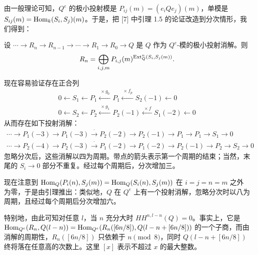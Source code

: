 由一般理论可知，$Q^e$ 的极小投射模是 $P_{ij}(m)=(e_iQe_j)(m)$，单模是 $S_{ij}(m)=\operatorname{Hom}_k(S_i,S_j)(m)$。于是，把 [7] 中引理 1.5 的论证改造到分次情形，我们得到：

\begin{lemma*}
设 $\cdots\to R_n\to R_{n-1}\to\cdots\to R_1\to R_0\to Q$ 是 $Q$ 作为 $Q^e$-模的极小投射消解。则
\[
R_n=\bigoplus_{i,j,m}P_{i,j}(m)^{\operatorname{Ext}^n_Q(S_i,S_j(m))}.
\]
\end{lemma*}

现在容易验证存在正合列
\begin{gather*}
0\longleftarrow S_1\longleftarrow P_1\xleftarrow{\ \times g_0\ }P_1\xleftarrow{\ \times f_p\ }S_2(-1)\longleftarrow 0\\
0\longleftarrow S_2\longleftarrow P_2\xleftarrow{\ \times g_1\ }P_2(-1)\xleftarrow{\ \times f\ }S_1(-2)\longleftarrow 0
\end{gather*}
从而存在如下投射消解：
\begin{gather*}
\cdots\to P_1(-3)\to P_1(-3)\xrightarrow{\ \cdot\ }P_2(-2)\to P_2(-1)\to P_1\to P_1\to S_1\to 0\\
\cdots\to P_2(-4)\to P_2(-3)\xrightarrow{\ \cdot\ }P_1(-2)\to P_1(-2)\to P_2(-1)\to P_2\to S_2\to 0
\end{gather*}
忽略分次后，这些消解以四为周期。带点的箭头表示第一个周期的结束；当然，末尾的 $S_i\to0$ 部分不重复。经过每个周期后，分次增加三。



现在注意到 $\operatorname{Hom}_Q(P_i(n),S_j(m))=\operatorname{Hom}_Q(S_i(n),S_j(m))$ 在 $i=j=n=m$ 之外为零，于是由引理推出：类似地，$Q$ 在 $Q^e$ 上有一个投射消解，忽略分次时以八为周期，且经过每个周期后分次增加六。

特别地，由此可知对任意 $l$，当 $n$ 充分大时 $HH^{n,l-n}(Q)=0$。事实上，它是 $\operatorname{Hom}_{Q^e}(R_n,Q(l-n))=\operatorname{Hom}_{Q^e}(R_n([6n/8]),Q(l-n+[6n/8]))$ 的一个子商，而由消解的周期性，$R_n([6n/8])$ 只依赖于 $n\pmod 8$，同时 $Q(l-n+[6n/8])$ 终将落在任意高的次数上。这里 $[x]$ 表示不超过 $x$ 的最大整数。

